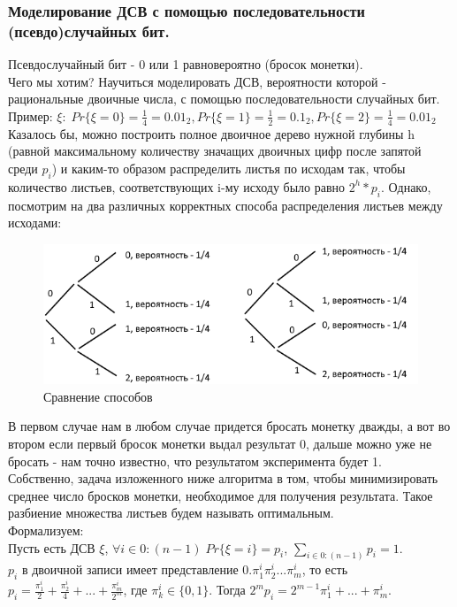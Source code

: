 \subsubsection{Моделирование ДСВ с помощью последовательности (псевдо)случайных бит.}
Псевдослучайный бит - 0 или 1 равновероятно (бросок монетки).\\
Чего мы хотим? Научиться моделировать ДСВ, вероятности которой - рациональные двоичные числа, с помощью последовательности случайных бит.\\
Пример: $\xi: \; Pr\{\xi = 0\} = \frac{1}{4} = 0.01_2, Pr\{\xi = 1\} = \frac{1}{2} = 0.1_2, Pr\{\xi = 2\} = \frac{1}{4} = 0.01_2$\\
Казалось бы, можно построить полное двоичное дерево нужной глубины h (равной максимальному количеству значащих двоичных цифр после запятой среди $p_i$) и каким-то образом распределить листья по исходам так, чтобы количество листьев, соответствующих i-му исходу было равно $2^h * p_i$. Однако, посмотрим на два различных корректных способа распределения листьев между исходами:\\
\begin{figure}[H]
\includegraphics[width=\linewidth]{Bits1.png}
\caption{Сравнение способов}
\label{fig:Bits1}
\end{figure}
В первом случае нам в любом случае придется бросать монетку дважды, а вот во втором если первый бросок монетки выдал результат 0, дальше можно уже не бросать - нам точно известно, что результатом эксперимента будет 1.\\
Собственно, задача изложенного ниже алгоритма в том, чтобы минимизировать среднее число бросков монетки, необходимое для получения результата. Такое разбиение множества листьев будем называть оптимальным.\\
Формализуем:\\
Пусть есть ДСВ $\xi$, $\forall i \in 0:(n - 1) \; Pr\{\xi = i\} = p_i$, $\sum\limits_{i \in 0:(n - 1)}p_i = 1$.\\
$p_i$ в двоичной записи имеет представление $0.\pi^i_1\pi^i_2...\pi^i_m$, то есть $p_i = \frac{\pi^i_1}{2} + \frac{\pi^i_2}{4} + ... + \frac{\pi^i_m}{2^m}$, где $\pi^i_k \in \{0, 1\}$. Тогда $2^mp_i = 2^{m - 1}\pi^i_1 + ... + \pi^i_{m}$.\\
